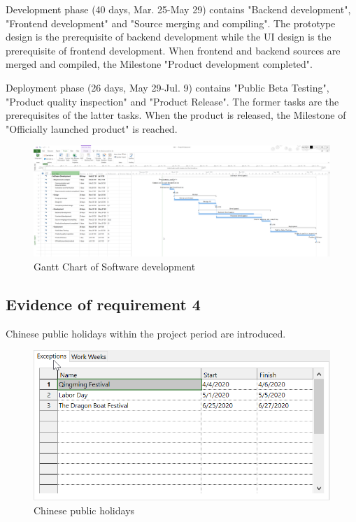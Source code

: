 \documentclass[runningheads]{llncs}
\begin{document}
\noindent Development phase (40 days, Mar. 25-May 29) contains "Backend development", "Frontend development" and "Source merging and compiling". The prototype design is the prerequisite of backend development while the UI design is the prerequisite of frontend development. When frontend and backend sources are merged and compiled, the Milestone "Product development completed". 

\noindent Deployment phase (26 days, May 29-Jul. 9) contains "Public Beta Testing", "Product quality inspection" and "Product Release". The former tasks are the prerequisites of the latter tasks. When the product is released, the Milestone of "Officially launched product" is reached.


\begin{figure}[H]
    \centering
    \includegraphics[width=1.0\textwidth]{./image/lab1-1}
    \caption{Gantt Chart of Software development}
\end{figure}

\subsection{Evidence of requirement 4}
Chinese public holidays within the project period are introduced. 

\begin{figure}[H]
    \centering
    \includegraphics[width=1.0\textwidth]{./image/festivals}
    \caption{Chinese public holidays}
\end{figure}
\end{document}
